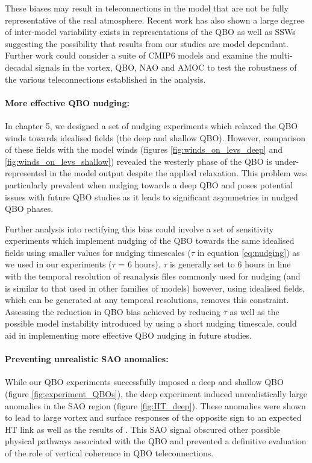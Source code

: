 These biases may result in teleconnections in the model that are not be fully representative of the real atmosphere. Recent work has also shown a large degree of inter-model variability exists in representations of the QBO \citep{bushellEvaluation2020b} as well as SSWs \citep{ayarzaguenaUncertainty2020b} suggesting the possibility that results from our studies are model dependant. Further work could consider a suite of CMIP6 models and examine the multi-decadal signals in the vortex, QBO, NAO and AMOC to test the robustness of the various teleconnections established in the analysis.   

\paragraph{More effective QBO nudging:}
In chapter 5, we designed a set of nudging experiments which relaxed the QBO winds towards idealised fields (the deep and shallow QBO). However, comparison of these fields with the model winds (figures \ref{fig:winds_on_levs_deep} and \ref{fig:winds_on_levs_shallow}) revealed the westerly phase of the QBO is under-represented in the model output despite the applied relaxation. This problem was particularly prevalent when nudging towards a deep QBO and poses potential issues with future QBO studies as it leads to significant asymmetries in nudged QBO phases.

Further analysis into rectifying this bias could involve a set of sensitivity experiments which implement nudging of the QBO towards the same idealised fields using smaller values for nudging timescales ($\tau$ in equation \ref{eq:nudging}) as we used in our experiments ($\tau$ = 6 hours). $\tau$ is generally set to 6 hours in line with the temporal resolution of reanalysis files commonly used for nudging (and is similar to that used in other families of models) \citep{telfordTechnical2008} however, using idealised fields, which can be generated at any temporal resolutions, removes this constraint. Assessing the reduction in QBO bias achieved by reducing $\tau$ as well as the possible model instability introduced by using a short nudging timescale, could aid in implementing more effective QBO nudging in future studies.

\paragraph{Preventing unrealistic SAO anomalies:}
While our QBO experiments successfully imposed a deep and shallow QBO (figure \ref{fig:experiment_QBOs}), the deep experiment induced unrealistically large anomalies in the SAO region (figure \ref{fig:HT_deep}). These anomalies were shown to lead to large vortex and surface responses of the opposite sign to an expected HT link as well as the results of \cite{andrewsObserved2019d}. This SAO signal obscured other possible physical pathways associated with the QBO and prevented a definitive evaluation of the role of vertical coherence in QBO teleconnections. 


